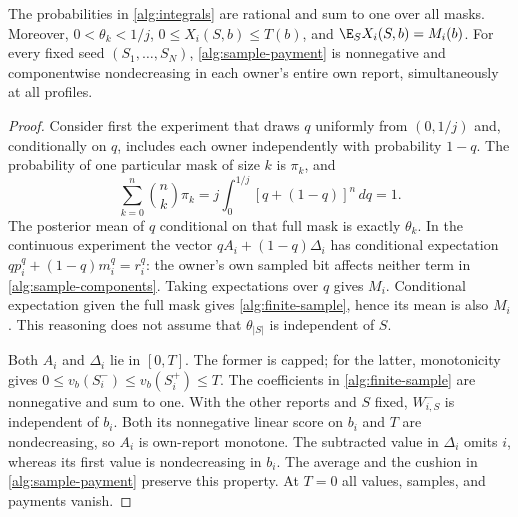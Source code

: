\begin{lemma}
\label{alg:finite-law}
The probabilities in \eqref{alg:integrals} are rational and sum to one over
all masks.  Moreover, $0<\theta_k<1/j$, $0\le X_i(S,b)\le T(b)$, and
$\E_S X_i(S,b)=M_i(b)$.  For every fixed seed $(S_1,\ldots,S_N)$,
\eqref{alg:sample-payment} is nonnegative and componentwise nondecreasing
in each owner's entire own report, simultaneously at all profiles.
\end{lemma}
\begin{proof}
Consider first the experiment that draws $q$ uniformly from $(0,1/j)$ and,
conditionally on $q$, includes each owner independently with probability
$1-q$.  The probability of one particular mask of size $k$ is $\pi_k$,
and
\[
 \sum_{k=0}^n\binom nk\pi_k
 =j\int_0^{1/j}[q+(1-q)]^n\,dq=1.
\]
The posterior mean of $q$ conditional on that full mask is exactly
$\theta_k$.  In the continuous experiment the vector
$qA_i+(1-q)\Delta_i$ has conditional expectation
$q p_i^q+(1-q)m_i^q=r_i^q$: the owner's own sampled bit affects neither
term in \eqref{alg:sample-components}.  Taking expectations over $q$ gives
$M_i$.  Conditional expectation given the full mask gives
\eqref{alg:finite-sample}, hence its mean is also $M_i$.
This reasoning does not assume that $\theta_{|S|}$ is independent of $S$.

Both $A_i$ and $\Delta_i$ lie in $[0,T]$.  The former is capped; for the
latter, monotonicity gives $0\le v_b(S_i^- )\le v_b(S_i^+)\le T$.
The coefficients in \eqref{alg:finite-sample} are nonnegative and sum to one.
With the other reports and $S$ fixed, $W^-_{i,S}$ is independent of $b_i$.
Both its nonnegative linear score on $b_i$ and $T$ are nondecreasing, so
$A_i$ is own-report monotone.  The subtracted value in $\Delta_i$ omits $i$,
whereas its first value is nondecreasing in $b_i$.  The average and the
cushion in \eqref{alg:sample-payment} preserve this property.
At $T=0$ all values, samples, and payments vanish.
\end{proof}

